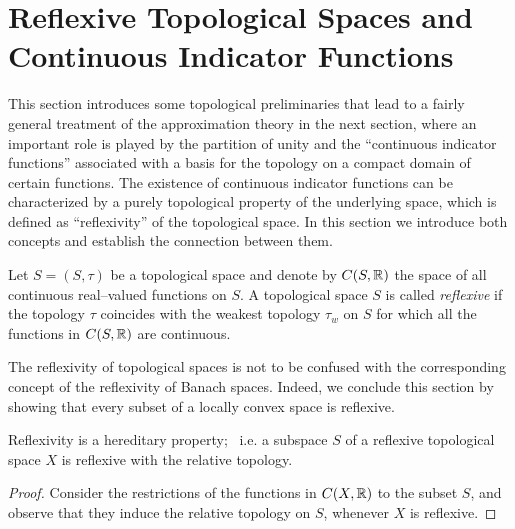 \bigskip

\goodbreak

\def\baselinestretch{1.1}

\section{Reflexive Topological Spaces and Continuous Indicator Functions}

This section introduces some topological preliminaries that lead to a fairly
general treatment of the approximation theory in the next section, where an
important role is played by the partition of unity and the ``continuous
indicator functions'' associated with a basis for the topology on a compact
domain of certain functions. The existence of continuous indicator functions
can be characterized by a purely topological property of the underlying
space, which is defined as ``reflexivity'' of the topological space. In this
section we introduce both concepts and establish the connection between them.

\def\baselinestretch{1.66}

\bigskip
\goodbreak
\newpage

\begin{defn}
Let $S=(S,\tau)$ be a topological space and denote by $C(S,\mathbb R)$ the space
of all continuous real--valued functions on $S$. A topological space $S$ is
called {\em reflexive} if the topology $\tau$ coincides with the weakest
topology $\tau_w$ on $S$ for which all the functions in $C(S,\mathbb R)$ are
continuous.
\end{defn}

\begin{rem}
The reflexivity of topological spaces is not to be confused with the
corresponding concept of the reflexivity of Banach spaces. Indeed, we
conclude this section by showing that every subset of a locally convex space
is reflexive.
\end{rem}

\begin{prop}
Reflexivity is a hereditary property; \, i.e. a subspace $S$ of a reflexive
topological space $X$ is reflexive with the relative topology.
\end{prop}

\begin{proof}
Consider the restrictions of the functions in $C(X,\mathbb R)$ to the subset $S$,
and observe that they induce the relative topology on $S$, whenever $X$ is
reflexive.
\end{proof}

